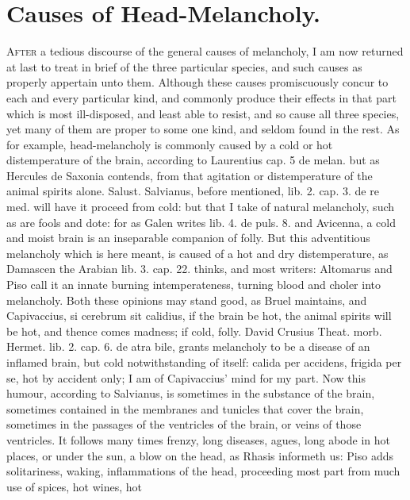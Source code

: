 {%
\section{Causes of Head-Melancholy.}

\lettrine{A}{fter} a tedious discourse of the general causes of melancholy, I am now
returned at last to treat in brief of the three particular species, and
such causes as properly appertain unto them. Although these causes
promiscuously concur to each and every particular kind, and commonly
produce their effects in that part which is most ill-disposed, and
least able to resist, and so cause all three species, yet many of them
are proper to some one kind, and seldom found in the rest. As for
example, head-melancholy is commonly caused by a cold or hot
distemperature of the brain, according to Laurentius cap. 5 de melan.
but as Hercules de Saxonia contends, from that agitation or
distemperature of the animal spirits alone. Salust. Salvianus, before
mentioned, lib. 2. cap. 3. de re med. will have it proceed from cold:
but that I take of natural melancholy, such as are fools and dote: for
as Galen writes lib. 4. de puls. 8. and Avicenna, a cold and
moist brain is an inseparable companion of folly. But this adventitious
melancholy which is here meant, is caused of a hot and dry
distemperature, as Damascen the Arabian lib. 3. cap. 22. thinks,
and most writers: Altomarus and Piso call it an innate burning
intemperateness, turning blood and choler into melancholy. Both these
opinions may stand good, as Bruel maintains, and Capivaccius, si
cerebrum sit calidius, if the brain be hot, the animal spirits
will be hot, and thence comes madness; if cold, folly. David Crusius
Theat. morb. Hermet. lib. 2. cap. 6. de atra bile, grants melancholy to
be a disease of an inflamed brain, but cold notwithstanding of itself:
calida per accidens, frigida per se, hot by accident only; I am of
Capivaccius' mind for my part. Now this humour, according to Salvianus,
is sometimes in the substance of the brain, sometimes contained in the
membranes and tunicles that cover the brain, sometimes in the passages
of the ventricles of the brain, or veins of those ventricles. It
follows many times frenzy, long diseases, agues, long abode in
hot places, or under the sun, a blow on the head, as Rhasis informeth
us: Piso adds solitariness, waking, inflammations of the head,
proceeding most part from much use of spices, hot wines, hot
}
